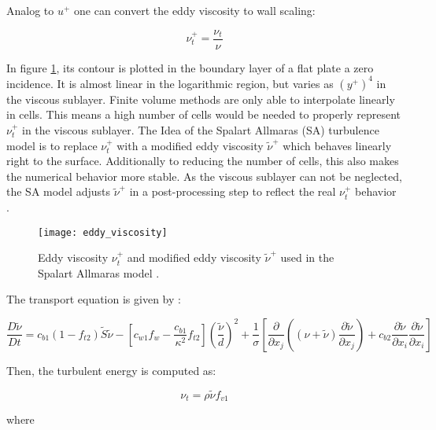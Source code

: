 Analog to $u^{+}$ one can convert the eddy viscosity to wall scaling:

\begin{equation}
  \nu_{t}^{+} = \frac{\nu_{t}}{\nu}
\end{equation}

\noindent In figure \ref{fig:nu_t_wall}, its contour is plotted in the boundary
layer of a flat plate a zero incidence. It is almost linear in the logarithmic
region, but varies as $(y^{+})^{4}$ in the viscous sublayer. Finite volume
methods are only able to interpolate linearly in cells. This means a high number
of cells would be needed to properly represent $\nu_{t}^{+}$ in the viscous
sublayer. The Idea of the Spalart Allmaras (SA) turbulence model is to replace
$\nu_{t}^{+}$ with a modified eddy viscosity $\tilde \nu^{+}$ which behaves
linearly right to the surface. Additionally to reducing the number of cells,
this also makes the numerical behavior more stable. As the viscous sublayer can
not be neglected, the SA model adjusts $\tilde \nu^{+}$ in a post-processing step
to reflect the real $\nu_{t}^{+}$ behavior \cite{KALITZIN2005265} \cite{fluid_101}.

\begin{figure}[H] \centering
  \texttt{[image: eddy\_viscosity]}
  \caption{Eddy viscosity $\nu_{t}^{+}$ and modified eddy viscosity
    $\tilde \nu^{+}$ used in the Spalart Allmaras model \cite{KALITZIN2005265}.}
  \label{fig:nu_t_wall}
\end{figure}

\noindent The transport equation is given by \cite{nasatmr}:

\begin{equation}
  \frac{D \tilde \nu}{D t} =
  c_{b1}(1 - f_{t2}) \tilde S \tilde \nu -
  \left[ c_{w1}f_{w} - \frac{c_{b1}}{\kappa^{2}}f_{t2} \right]
  \left( \frac{\tilde \nu}{d} \right) ^{2} +
  \frac{1}{\sigma} \left[ \frac{\partial}{\partial x_{j}}
  \left( (\nu + \tilde \nu) \frac{\partial \tilde \nu}{\partial x_{j}}\right) +
  c_{b2} \frac{\partial \tilde \nu}{\partial x_{i}} \frac{\partial \tilde \nu}{\partial x_{i}} \right]
\end{equation}

\noindent Then, the turbulent energy is computed as:

\begin{equation}
  \nu_{t} = \rho \tilde \nu f_{v1}
\end{equation}

\noindent where

